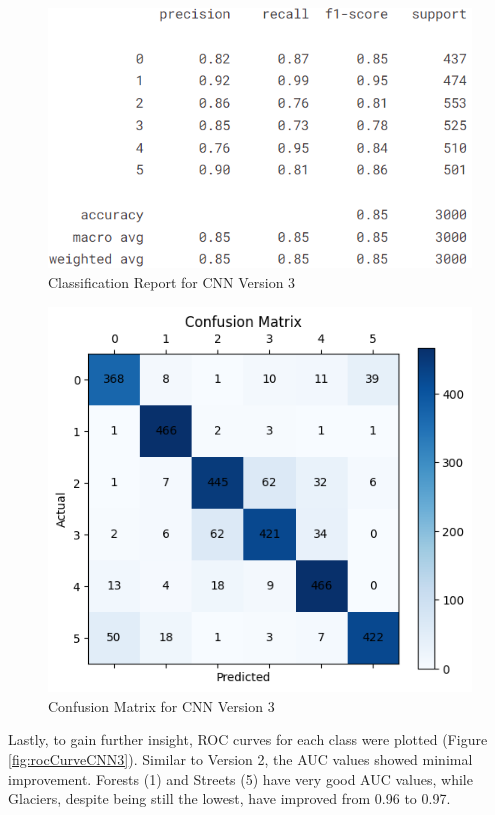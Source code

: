 \documentclass[conference]{IEEEtran}
\begin{document}
\begin{figure}[H]
    \centering
    \includegraphics[width=0.7\linewidth]{images/cnn_class_report_3.png}
    \caption{Classification Report for CNN Version 3}
    \label{fig:classReportCNN3}
\end{figure}

\begin{figure}[H]
    \centering
    \includegraphics[width=0.7\linewidth]{images/confusion_matrix_cnn_3.png}
    \caption{Confusion Matrix for CNN Version 3}
    \label{fig:confusionMatrixCNN3}
\end{figure}

Lastly, to gain further insight, ROC curves for each class were plotted (Figure \ref{fig:rocCurveCNN3}). Similar to Version 2, the AUC values showed minimal improvement. Forests (1) and Streets (5) have very good AUC values, while Glaciers, despite being still the lowest, have improved from 0.96 to 0.97.
\end{document}
